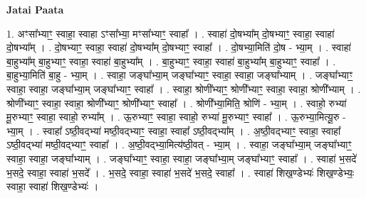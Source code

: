 \documentclass[17pt]{extarticle}
\begin{document}
\textbf{Jatai Paata} \newline

1. अꣳसा᳚भ्याꣳ॒॒ स्वाहा॒ स्वाहा ऽꣳसा᳚भ्या॒ मꣳसा᳚भ्याꣳ॒॒ स्वाहा᳚ । . स्वाहा॑ दो॒षभ्या᳚म् दो॒षभ्याꣳ॒॒ स्वाहा॒ स्वाहा॑ दो॒षभ्या᳚म् । . दो॒षभ्याꣳ॒॒ स्वाहा॒ स्वाहा॑ दो॒षभ्या᳚म् दो॒षभ्याꣳ॒॒ स्वाहा᳚ । . दो॒षभ्या॒मिति॑ दो॒ष - भ्या॒म् । . स्वाहा॑ बा॒हुभ्या᳚म् बा॒हुभ्याꣳ॒॒ स्वाहा॒ स्वाहा॑ बा॒हुभ्या᳚म् । . बा॒हुभ्याꣳ॒॒ स्वाहा॒ स्वाहा॑ बा॒हुभ्या᳚म् बा॒हुभ्याꣳ॒॒ स्वाहा᳚ । . बा॒हुभ्या॒मिति॑ बा॒हु - भ्या॒म् । . स्वाहा॒ जङ्घा᳚भ्या॒म् जङ्घा᳚भ्याꣳ॒॒ स्वाहा॒ स्वाहा॒ जङ्घा᳚भ्याम् । . जङ्घा᳚भ्याꣳ॒॒ स्वाहा॒ स्वाहा॒ जङ्घा᳚भ्या॒म् जङ्घा᳚भ्याꣳ॒॒ स्वाहा᳚ । . स्वाहा॒ श्रोणी᳚भ्याꣳ॒॒ श्रोणी᳚भ्याꣳ॒॒ स्वाहा॒ स्वाहा॒ श्रोणी᳚भ्याम् । . श्रोणी᳚भ्याꣳ॒॒ स्वाहा॒ स्वाहा॒ श्रोणी᳚भ्याꣳ॒॒ श्रोणी᳚भ्याꣳ॒॒ स्वाहा᳚ । . श्रोणी᳚भ्या॒मिति॒ श्रोणि॑ - भ्या॒म् । . स्वाहो॒ रुभ्या॑ मू॒रुभ्याꣳ॒॒ स्वाहा॒ स्वाहो॒ रुभ्या᳚म् । . ऊ॒रुभ्याꣳ॒॒ स्वाहा॒ स्वाहो॒ रुभ्या॑ मू॒रुभ्याꣳ॒॒ स्वाहा᳚ । . ऊ॒रुभ्या॒मित्यू॒रु - भ्या॒म् । . स्वाहा᳚ ऽष्ठी॒वद्भ्या॑ मष्ठी॒वद्भ्याꣳ॒॒ स्वाहा॒ स्वाहा᳚ ऽष्ठी॒वद्भ्या᳚म् । . अ॒ष्ठी॒वद्भ्याꣳ॒॒ स्वाहा॒ स्वाहा᳚ ऽष्ठी॒वद्भ्या॑ मष्ठी॒वद्भ्याꣳ॒॒ स्वाहा᳚ । . अ॒ष्ठी॒वद्भ्या॒मित्य॑ष्ठी॒वत् - भ्या॒म् । . स्वाहा॒ जङ्घा᳚भ्या॒म् जङ्घा᳚भ्याꣳ॒॒ स्वाहा॒ स्वाहा॒ जङ्घा᳚भ्याम् । . जङ्घा᳚भ्याꣳ॒॒ स्वाहा॒ स्वाहा॒ जङ्घा᳚भ्या॒म् जङ्घा᳚भ्याꣳ॒॒ स्वाहा᳚ । . स्वाहा॑ भ॒सदे॑ भ॒सदे॒ स्वाहा॒ स्वाहा॑ भ॒सदे᳚ । . भ॒सदे॒ स्वाहा॒ स्वाहा॑ भ॒सदे॑ भ॒सदे॒ स्वाहा᳚ । . स्वाहा॑ शिख॒ण्डेभ्यः॑ शिख॒ण्डेभ्यः॒ स्वाहा॒ स्वाहा॑ शिख॒ण्डेभ्यः॑ । \newline
\end{document}
